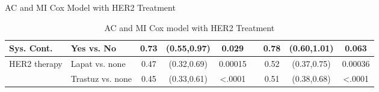 \begin{frame}{AC and MI Cox Model with HER2 Treatment}
\begin{table}[]
{\begin{tabular}{|l|l|c|c|c|c|c|c|c|}
Sys. Cont.                     & Yes vs. No                       & 0.73                  & (0.55,0.97)                                        & 0.029                 &                       & 0.78 & (0.60,1.01)                                                          & 0.063                                                       \\ \hline
HER2 therapy                   & Lapat vs. none                   & 0.47                  & (0.32,0.69)                                        & 0.00015               &                       & 0.52 & (0.37,0.75)                                                          & 0.00036                                                     \\ \hline
                               & Trastuz vs. none                 & 0.45                  & (0.33,0.61)                                        & \textless.0001        &                       & 0.51 & (0.38,0.68)                                                          & \textless.0001                                              \\ \hline
\end{tabular}
}
\caption{AC and MI Cox model with HER2 Treatment}

\end{table}
\end{frame}